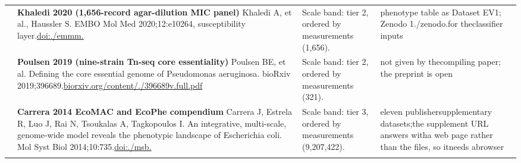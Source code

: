\begin{landscape}
\begin{longtable}{@{}r@{\hspace{4pt}} L{78mm} L{72mm} L{76mm}@{}}
 & \textbf{Khaledi 2020 (1,656-record agar-dilution MIC panel)} \newline Khaledi A, et al., Haussler S. EMBO Mol Med 2020;12:e10264, susceptibility layer.\newline \href{https://doi.org/10.15252/emmm.201910264}{doi:./\allowbreak emmm.} & Scale band: tier 2, ordered by measurements (1,656). & phenotyp\allowbreak e table \allowbreak as Datas\allowbreak et EV1; \allowbreak Zenodo 1./\allowbreak zenodo.\allowbreak  for the\allowbreak  classif\allowbreak ier inpu\allowbreak ts \\
 & \textbf{Poulsen 2019 (nine-strain Tn-seq core essentiality)} \newline Poulsen BE, et al. Defining the core essential genome of Pseudomonas aeruginosa. bioRxiv 2019;396689.\newline \href{https://www.biorxiv.org/content/10.1101/396689v2.full.pdf}{biorxiv.\allowbreak org/\allowbreak content\allowbreak /./\allowbreak 396689v.\allowbreak full.\allowbreak pdf} & Scale band: tier 2, ordered by measurements (321). & not give\allowbreak n by the\allowbreak  compili\allowbreak ng paper\allowbreak ; the pr\allowbreak eprint i\allowbreak s open \\
 & \textbf{Carrera 2014 EcoMAC and EcoPhe compendium} \newline Carrera J, Estrela R, Luo J, Rai N, Tsoukalas A, Tagkopoulos I. An integrative, multi-scale, genome-wide model reveals the phenotypic landscape of Escherichia coli. Mol Syst Biol 2014;10:735.\newline \href{https://doi.org/10.15252/msb.20145108}{doi:./\allowbreak msb.} & Scale band: tier 3, ordered by measurements (9,207,422). & eleven p\allowbreak ublisher\allowbreak  supplem\allowbreak entary d\allowbreak atasets;\allowbreak  the sup\allowbreak plement \allowbreak URL answ\allowbreak ers with\allowbreak  a web p\allowbreak age rath\allowbreak er than \allowbreak the file\allowbreak s, so it\allowbreak  needs a\allowbreak  browser \\
\addlinespace[5pt]

\end{longtable}
\end{landscape}
